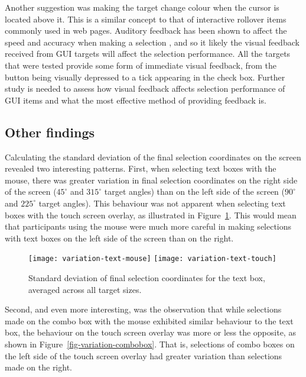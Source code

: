 \documentclass{elsart}
\begin{document}
Another suggestion was making the target change colour when the cursor
is located above it. This is a similar concept to that of interactive
rollover items commonly used in web pages. Auditory feedback has been
shown to affect the speed and accuracy when making a selection
\citep{Bend-G-1999-PhD}, and so it likely the visual feedback received
from GUI targets will affect the selection performance. All the targets
that were tested provide some form of immediate visual feedback, from
the button being visually depressed to a tick appearing in the check
box. Further study is needed to assess how visual feedback affects
selection performance of GUI items and what the most effective method of
providing feedback is.


\subsection{Other findings}
\label{sec-results-other}

Calculating the standard deviation of the final selection coordinates on
the screen revealed two interesting patterns. First, when selecting text
boxes with the mouse, there was greater variation in final selection
coordinates on the right side of the screen (\(45^{\circ}\) and
\(315^{\circ}\) target angles) than on the left side of the screen
(\(90^{\circ}\) and \(225^{\circ}\) target angles). This behaviour was
not apparent when selecting text boxes with the touch screen overlay, as
illustrated in Figure~\ref{fig-variation-textbox}. This would mean that
participants using the mouse were much more careful in making selections
with text boxes on the left side of the screen than on the right.


\begin{figure}
	\centering
	\texttt{[image: variation-text-mouse]}
	\texttt{[image: variation-text-touch]}
	\caption{Standard deviation of final selection coordinates for the
	text box, averaged across all target sizes.}
	\label{fig-variation-textbox}
\end{figure}


Second, and even more interesting, was the observation that while
selections made on the combo box with the mouse exhibited similar
behaviour to the text box, the behaviour on the touch screen overlay was
more or less the opposite, as shown in
Figure~\ref{fig-variation-combobox}. That is, selections of combo boxes
on the left side of the touch screen overlay had greater variation than
selections made on the right.
\end{document}

